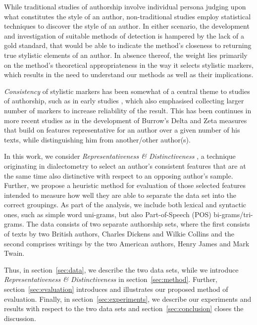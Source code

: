 \documentclass[a4paper,10pt,twoside,fleqn]{article}
\begin{document}
While traditional studies of authorship involve individual persona
judging upon what constitutes the style of an author, non-traditional
studies employ statistical techniques to discover the style of
an author. 
In either scenario, the development and investigation of suitable
methods of detection is hampered by the lack of a gold standard,
that would be able to indicate the method's closeness to 
returning true stylistic elements of an author. 
In absence thereof, the weight lies primarily on the method's 
theoretical appropriateness in the way it selects stylistic 
markers, which results in the need to understand our methods 
as well as their implications. 

\emph{Consistency} of stylistic markers has been somewhat of 
a central theme to studies of authorship, such as in early 
studies \cite{Mosteller2008}, which also emphasised collecting
larger number of markers to increase reliability of the result.
This has been continues in more recent studies as in 
the development of Burrow's Delta \cite{Burrows2002delta} 
and Zeta \cite{Burrows2007all} measures that build on
features representative for an author over a given number
of his texts, while distinguishing him from another/other 
author(s).

In this work, we consider \emph{Representativeness \& Distinctiveness}
\cite{prokic2012detecting}, a technique originating in dialectometry 
to select an author’s consistent features that are at the same time
also distinctive with respect to an opposing author’s sample.
Further, we propose a heuristic method for evaluation of those
selected features intended to measure how well they are able to
separate the data set into the correct groupings. 
As part of the analysis, we include both lexical and syntactic ones, 
such as simple word uni-grams, but also Part-of-Speech (POS) 
bi-grams/tri-grams.
The data consists of two separate authorship sets, where the first
consists of texts by two British authors, Charles Dickens and
Wilkie Collins and the second comprises writings by the two
American authors, Henry James and Mark Twain. 

Thus, in section~\ref{sec:data}, we describe the two data sets, while we 
introduce \emph{Representativeness \& Distinctiveness} 
in section~\ref{sec:method}. Further, section~\ref{sec:evaluation}
introduces and illustrates our proposed method of evaluation. 
Finally, in section~\ref{sec:experiments}, we describe our experiments
and results with respect to the two data sets and section~\ref{sec:conclusion}
closes the discussion. 
\end{document}
